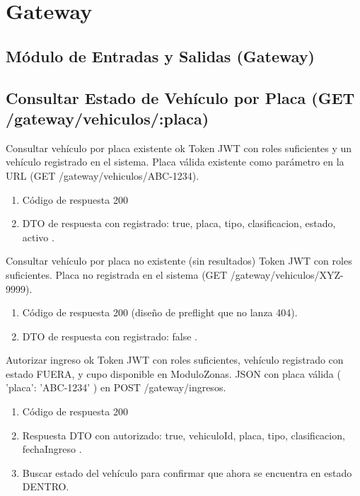 \section{Gateway}
\subsection{Módulo de Entradas y Salidas (Gateway)}

\subsection{Consultar Estado de Vehículo por Placa (GET /gateway/vehiculos/:placa)}

{Consultar vehículo por placa existente ok}
{Token JWT con roles suficientes y un vehículo registrado en el sistema.}
{Placa válida existente como parámetro en la URL (GET /gateway/vehiculos/ABC-1234).}
{\begin{enumerate} [leftmargin=*, nosep]
    \item Código de respuesta 200
    \item DTO de respuesta con { registrado: true, placa, tipo, clasificacion, estado, activo }.
\end{enumerate}}

{Consultar vehículo por placa no existente (sin resultados)}
{Token JWT con roles suficientes.}
{Placa no registrada en el sistema (GET /gateway/vehiculos/XYZ-9999).}
{\begin{enumerate} [leftmargin=*, nosep]
    \item Código de respuesta 200 (diseño de preflight que no lanza 404).
    \item DTO de respuesta con { registrado: false }.
\end{enumerate}}

{Autorizar ingreso ok}
{Token JWT con roles suficientes, vehículo registrado con estado FUERA, y cupo disponible en ModuloZonas.}
{JSON con placa válida ({ 'placa': 'ABC-1234' }) en POST /gateway/ingresos.}
{\begin{enumerate} [leftmargin=*, nosep]
    \item Código de respuesta 200
    \item Respuesta DTO con { autorizado: true, vehiculoId, placa, tipo, clasificacion, fechaIngreso }.
    \item Buscar estado del vehículo para confirmar que ahora se encuentra en estado DENTRO.
\end{enumerate}}

